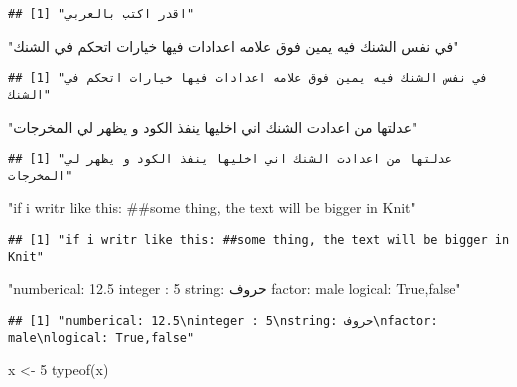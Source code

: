 \documentclass[
]{article}
\newenvironment{Shaded}{\begin{snugshade}}{\end{snugshade}}
\newcommand{\DecValTok}[1]{\textcolor[rgb]{0.00,0.00,0.81}{#1}}
\newcommand{\FunctionTok}[1]{\textcolor[rgb]{0.00,0.00,0.00}{#1}}
\newcommand{\NormalTok}[1]{#1}
\newcommand{\OtherTok}[1]{\textcolor[rgb]{0.56,0.35,0.01}{#1}}
\newcommand{\StringTok}[1]{\textcolor[rgb]{0.31,0.60,0.02}{#1}}
\begin{document}
\begin{verbatim}
## [1] "اقدر اكتب بالعربي"
\end{verbatim}

\begin{Shaded}
\begin{Highlighting}[]
\StringTok{"في نفس الشنك فيه يمين فوق علامه اعدادات فيها خيارات اتحكم في الشنك"}
\end{Highlighting}
\end{Shaded}

\begin{verbatim}
## [1] "في نفس الشنك فيه يمين فوق علامه اعدادات فيها خيارات اتحكم في الشنك"
\end{verbatim}

\begin{Shaded}
\begin{Highlighting}[]
\StringTok{"عدلتها من اعدادت الشنك اني اخليها ينفذ الكود و يظهر لي المخرجات"}
\end{Highlighting}
\end{Shaded}

\begin{verbatim}
## [1] "عدلتها من اعدادت الشنك اني اخليها ينفذ الكود و يظهر لي المخرجات"
\end{verbatim}

\begin{Shaded}
\begin{Highlighting}[]
\StringTok{"if i writr like this: \#\#some thing, the text will be bigger in Knit"}
\end{Highlighting}
\end{Shaded}

\begin{verbatim}
## [1] "if i writr like this: ##some thing, the text will be bigger in Knit"
\end{verbatim}

\begin{Shaded}
\begin{Highlighting}[]
\StringTok{"numberical: 12.5}
\StringTok{integer : 5}
\StringTok{string: حروف}
\StringTok{factor: male}
\StringTok{logical: True,false"}
\end{Highlighting}
\end{Shaded}

\begin{verbatim}
## [1] "numberical: 12.5\ninteger : 5\nstring: حروف\nfactor: male\nlogical: True,false"
\end{verbatim}

\begin{Shaded}
\begin{Highlighting}[]
\NormalTok{x }\OtherTok{\textless{}{-}} \DecValTok{5}
\FunctionTok{typeof}\NormalTok{(x)}
\end{Highlighting}
\end{Shaded}
\end{document}
